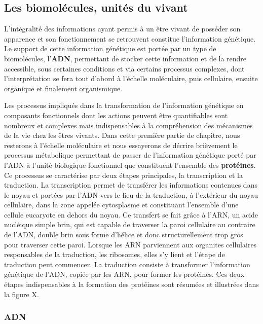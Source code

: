 \subsection{Les biomolécules, unités du vivant}

L'intégralité des informations ayant permis à un être vivant de posséder son apparence et son fonctionnement se retrouvent constitue l'information génétique. Le support de cette information génétique est portée par un type de biomolécules, l'\textbf{ADN}, permettant de stocker cette information et de la rendre accessible, sous certaines conditions et via certains processus complexes, dont l'interprétation se fera tout d'abord à l'échelle moléculaire, puis cellulaire, ensuite organique et finalement organismique.

Les processus impliqués dans la transformation de l'information génétique en composants fonctionnels dont les actions peuvent être quantifiables sont nombreux et complexes mais indispensables à la compréhension des mécanismes de la vie chez les êtres vivants. Dans cette première partie de chapitre, nous resterons à l'échelle moléculaire et nous essayerons de décrire brièvement le processus métabolique permettant de passer de l'information génétique porté par l'ADN à l'unité biologique fonctionnel que constituent l'ensemble des \textbf{protéines}.
Ce processus se caractérise par deux étapes principales, la transcription et la traduction. La transcription permet de transférer les informations contenues dans le noyau et portées par l'ADN vers le lieu de la traduction, à l'extérieur du noyau cellulaire, dans la zone appelée cytosplasme et constituant l'ensemble d'une cellule eucaryote en dehors du noyau. Ce transfert se fait grâce à l'ARN, un acide nucléique simple brin, qui est capable de traverser la paroi cellulaire au contraire de l'ADN, double brin sous forme d'hélice et donc structurellement trop gros pour traverser cette paroi. Lorsque les ARN parviennent aux organites cellulaires responsables de la traduction, les ribosomes, elles s'y lient et l'étape de traduction peut commencer. La traduction consiste à transformer l'information génétique de l'ADN, copiée par les ARN, pour former les protéines. Ces deux étapes indispensables à la formation des protéines sont résumées et illustrées dans la figure X.

\subsubsection{ADN}

